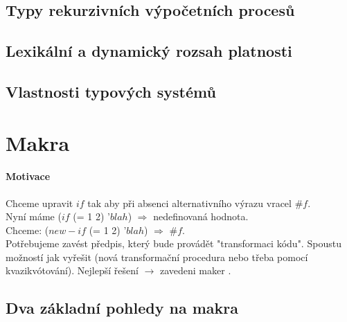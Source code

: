 \documentclass[10pt,a4paper]{article}
\begin{document}
  \subsection{Typy rekurzivních výpočetních procesů}
  \subsection{Lexikální a dynamický rozsah platnosti}
  \subsection{Vlastnosti typových systémů}


\newpage
\section{Makra}
\paragraph{Motivace} Chceme upravit $if$ tak aby při absenci alternativního výrazu vracel $\#f$.
\\ Nyní máme (\color{red}$if$ \color{black} (= 1 2) '$blah$) $\Rightarrow$ nedefinovaná hodnota.
\\ Chceme: (\color{red}$new-if$ \color{black} (= 1 2) '$blah$) $\Rightarrow$ $\#f$.
\\ Potřebujeme zavést předpis, který bude provádět "transformaci kódu". Spoustu možností jak vyřešit (nová transformační procedura nebo třeba pomocí kvazikvótování). Nejlepší řešení $\rightarrow$ zavedeni \color{blue} maker \color{black}.
\subsection{Dva základní pohledy na makra}
\end{document}
